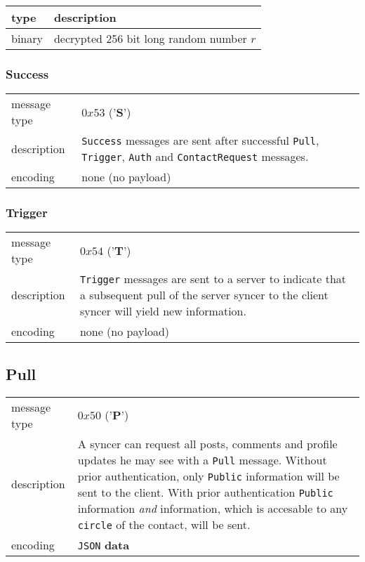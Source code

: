 \documentclass[12pt]{article}
\begin{document}
\begin{tabular}{|l|l|}
\hline
type & description \\\hline\hline
binary & decrypted 256 bit long random number $r$ \\\hline
\end{tabular}

\subsubsection*{Success}

\begin{tabular}{l p{}}
\hline
message type & $0x53$ ('\textbf{S}') \\
description & \texttt{Success} messages are sent after successful \texttt{Pull}, \texttt{Trigger}, \texttt{Auth} and \texttt{ContactRequest} messages. \\
encoding & none (no payload) \\\hline
\end{tabular}

\subsubsection*{Trigger}

\begin{tabular}{l p{}}
\hline
message type & $0x54$ ('\textbf{T}') \\
description & \texttt{Trigger} messages are sent to a server to indicate that a subsequent pull of the server syncer to the client syncer will yield new information. \\
encoding & none (no payload) \\
\end{tabular}

\subsection*{Pull}

\begin{tabular}{l p{}}
\hline
message type & $0x50$ ('\textbf{P}') \\
description & A syncer can request all posts, comments and profile updates he may see with a \texttt{Pull} message. Without prior authentication, only \texttt{Public} information will be sent to the client. With prior authentication \texttt{Public} information \textit{and} information, which is accesable to any \texttt{circle} of the contact, will be sent. \\
encoding & \texttt{JSON} \textbf{data} \\\hline
\end{tabular}
\end{document}
